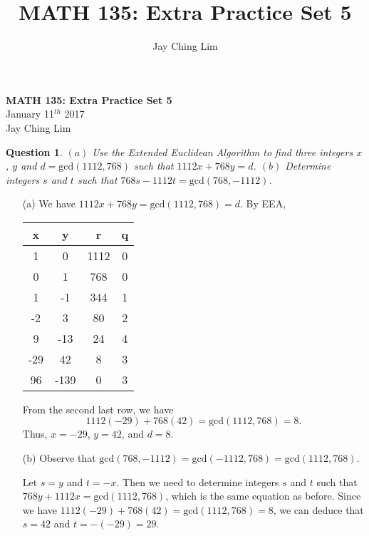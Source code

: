 \documentclass[11pt,oneside]{article}
\title{MATH 135: Extra Practice Set 5}
\author{Jay Ching Lim}
\newtheorem{question}{Question}
\begin{document}
\begin{center}
    \textbf{MATH 135: Extra Practice Set 5} \\
    January 11$^{th}$ 2017 \\

    Jay Ching Lim
\end{center}

\bigskip


\begin{question}
	$(a)$ Use the Extended Euclidean Algorithm to find three integers $x$, $y$ and $d = \text{gcd}(1112, 768)$ such that $1112x + 768y = d$. $(b)$ Determine integers $s$ and $t$ such that $768s - 1112t = \text{gcd}(768, -1112)$.
\end{question}

\begin{enumerate}
	\item[(a)]  We have $1112x + 768y = \text{gcd}(1112, 768) = d$. By EEA,

\begin{center}
	\begin{tabular}{c|c|c|c}
		x & y & r & q \\
		\hline
		1 & 0 & 1112 & 0\\
		0 & 1 & 768 & 0\\
		1 & -1 & 344 & 1\\
		-2 & 3 & 80 & 2\\
		9 & -13 & 24 & 4\\
		-29 & 42 & 8 & 3\\
		96 & -139 & 0 & 3\\
	\end{tabular}
\end{center}

From the second last row, we have $$1112(-29) + 768(42) = \text{gcd}(1112, 768) = 8.$$ Thus, $x = -29$, $y= 42$, and $d = 8$.

	\item[(b)] Observe that $\text{gcd}(768, -1112) = \text{gcd}(-1112, 768) = \text{gcd}(1112, 768)$.
	
Let $s = y$ and $t = -x$. Then we need to determine integers $s$ and $t$ such that $768y + 1112x = \text{gcd}(1112, 768)$, which is the same equation as before. Since we have $1112(-29) + 768(42) = \text{gcd}(1112, 768) = 8$, we can deduce that $s = 42$ and $t = -(-29) = 29$.

\end{enumerate}
\end{document}
